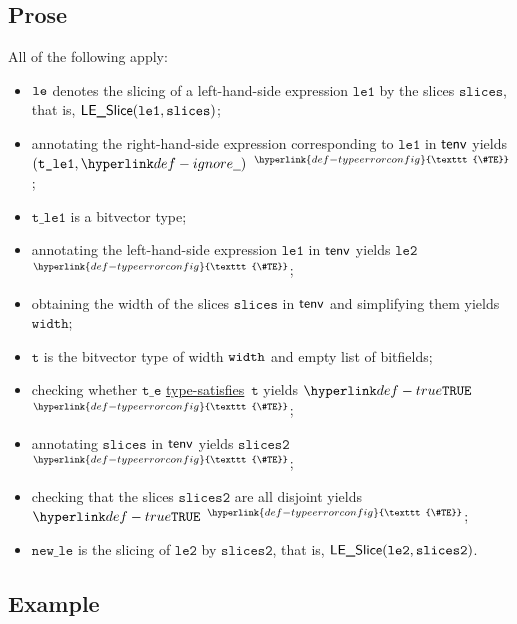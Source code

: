 \documentclass{book}
\newcommand\TypeErrorConfig[0]{\hyperlink{def-typeerrorconfig}{\texttt{\#TE}}}
\newcommand\ProseOrTypeError[0]{\hyperlink{def-proseortypeerror}{$^{\TypeErrorConfig}$}}
\newcommand\typesatisfies[0]{\hyperlink{def-typesatisfies}{type-satisfies}}
\newcommand\vt[0]{\texttt{t}}
\newcommand\vte[0]{\texttt{t\_e}}
\newcommand\vleone[0]{\texttt{le1}}
\newcommand\vletwo[0]{\texttt{le2}}
\newcommand\vtleone[0]{\texttt{t\_le1}}
\newcommand\vwidth[0]{\texttt{width}}
\newcommand\newle[0]{\texttt{new\_le}}
\newcommand\slices[0]{\texttt{slices}}
\newcommand\slicestwo[0]{\texttt{slices2}}
\begin{document}
\subsection{Prose}
All of the following apply:
\begin{itemize}
  \item $\texttt{le}$ denotes the slicing of a left-hand-side expression $\vleone$ by the slices $\slices$, that is, $\LESlice(\vleone, \slices)$;
  \item annotating the right-hand-side expression corresponding to $\vleone$ in $\textsf{tenv}$ yields \\
        $(\vtleone, \Ignore)$ \ProseOrTypeError;
  \item $\vtleone$ is a bitvector type;
  \item annotating the left-hand-side expression $\vleone$ in $\textsf{tenv}$ yields $\vletwo$ \ProseOrTypeError;
  \item obtaining the width of the slices $\slices$ in $\textsf{tenv}$ and simplifying them yields $\vwidth$;
  \item $\vt$ is the bitvector type of width $\texttt{width}$ and empty list of bitfields;
  \item checking whether $\vte$ \typesatisfies\ $\vt$ yields $\True$ \ProseOrTypeError;
  \item annotating $\slices$ in $\textsf{tenv}$ yields $\slicestwo$ \ProseOrTypeError;
  \item checking that the slices $\slicestwo$ are all disjoint yields $\True$ \ProseOrTypeError;
  \item $\newle$ is the slicing of $\vletwo$ by $\slicestwo$, that is, $\LESlice(\vletwo, \slicestwo)$.
\end{itemize}

\subsection{Example}

\end{document}
